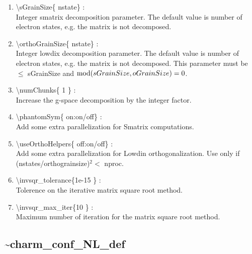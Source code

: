 \documentclass[12pt,titlepage]{article}
\begin{document}
\begin{enumerate}
  \vspace{0.15in} 
  \item \textbackslash{}sGrainSize\{ nstate\} : \\    
  Integer smatrix decomposition parameter. The default value is number of
  electron states, e.g. the matrix is not decomposed.
  \vspace{0.15in} 
  \item \textbackslash{}orthoGrainSize\{ nstate\} : \\    
  Integer lowdix decomposition parameter. The default value is number of
  electron states, e.g. the matrix is not decomposed. This parameter
  must be $\leq$ sGrainSize and ${\rm mod}(sGrainSize,oGrainSize)=0$.
  \vspace{0.15in} 
  \item \textbackslash{}numChunks\{ 1 \} : \\    
  Increase the g-space decomposition by the integer factor.
  \vspace{0.15in} 
  \item \textbackslash{}phantomSym\{ on:on/off\} : \\    
  Add some extra parallelization for Smatrix computations.
  \vspace{0.15in} 
  \item \textbackslash{}useOrthoHelpers\{ off:on/off\} : \\    
  Add some extra parallelization for Lowdin orthogonalization.
  Use only if (nstates/orthograinsize)$^2<$ nproc.
  \vspace{0.15in} 
  \item \textbackslash{}invsqr\_tolerance\{1e-15 \} : \\   
  Tolerence on the iterative matrix square root method.
  \vspace{0.15in} 
  \item \textbackslash{}invsqr\_max\_iter\{10 \} : \\    
  Maximum number of iteration for the matrix square root method.
\end{enumerate}

\newpage
\subsection*{\bf \~{ }charm\_conf\_NL\_def}
\end{document}
